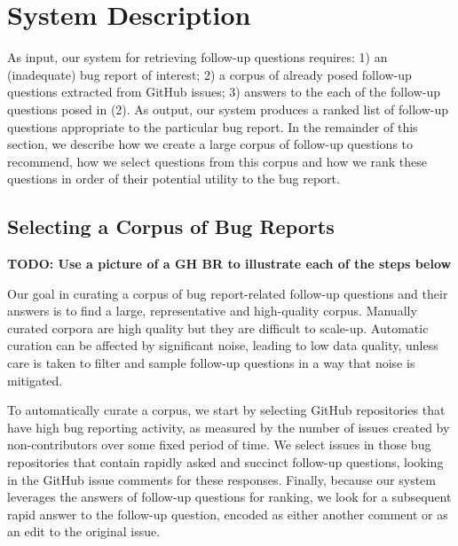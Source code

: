 \section{System Description}

As input, our system for retrieving follow-up questions requires: 1) an (inadequate) bug
report of interest; 2) a corpus of already posed follow-up questions extracted
from GitHub issues; 3) answers to the each of the follow-up questions posed in (2). As output, our system
produces a ranked list of follow-up questions appropriate to the particular bug report.
In the remainder of this section, we describe how we create a large corpus of follow-up questions
to recommend, how we select questions from this corpus and how we rank these questions in order
of their potential utility to the bug report.

\subsection{Selecting a Corpus of Bug Reports}

{\bf TODO: Use a picture of a GH BR to illustrate each of the steps below}

Our goal in curating a corpus of bug report-related follow-up questions and their answers
is to find a large, representative and high-quality corpus. Manually curated corpora are
high quality but they are difficult to scale-up. Automatic curation can be affected by
significant noise, leading to low data quality, unless care is taken
to filter and sample follow-up questions in a way that noise is mitigated.

To automatically curate a corpus, we start by selecting GitHub repositories that have high bug reporting activity,
as measured by the number of issues created by non-contributors over some fixed period of time.
We select issues in those bug repositories that contain rapidly asked and succinct follow-up
questions, looking in the GitHub issue comments for these responses. Finally, because our system leverages
the answers of follow-up questions for ranking, we look for
a subsequent rapid answer to the follow-up question, encoded as either another comment or as an edit to the
original issue.

